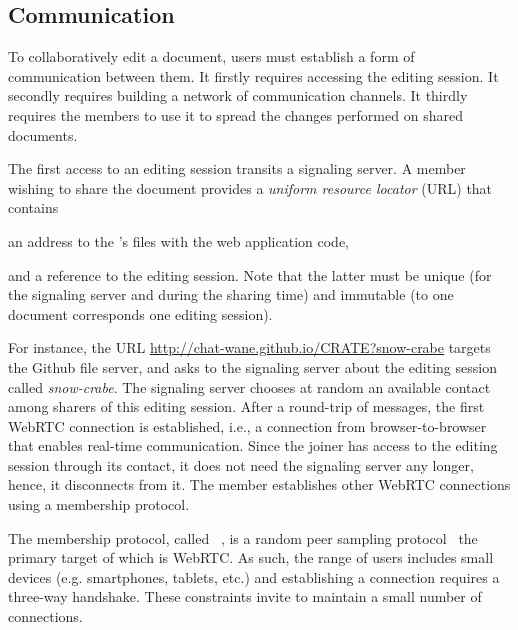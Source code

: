\subsection{Communication}
\label{subsec:communication}

To collaboratively edit a document, users must establish a form of communication
between them. It firstly requires accessing the editing session. It secondly
requires building a network of communication channels. It thirdly requires the
members to use it to spread the changes performed on shared documents.  

\begin{asparadesc}
\item [The first access] to an editing session transits a signaling server. A
  member wishing to share the document provides a \emph{uniform resource
    locator} (URL) that contains
  \begin{inparaenum}[(i)]
  \item an address to the \CRATE's files with the web application
    code,
  \item and a reference to the editing session. Note that the latter must be
    unique (for the signaling server and during the sharing time) and
    immutable (to one document corresponds one editing session).
  \end{inparaenum}
  For instance, the URL \url{http://chat-wane.github.io/CRATE?snow-crabe}
  targets the Github file server, and asks to the signaling server about the
  editing session called \emph{snow-crabe}.  The signaling server chooses at
  random an available contact among sharers of this editing session. After a
  round-trip of messages, the first WebRTC connection is established, i.e., a
  connection from browser-to-browser that enables real-time communication. Since
  the joiner has access to the editing session through its contact, it does not
  need the signaling server any longer, hence, it disconnects from it. The
  member establishes other WebRTC connections using a membership protocol.

\item [The membership protocol,] called \SPRAY~\cite{nedelec2015spray}, is a
  random peer sampling protocol~\cite{jelasity2007gossip} the primary target of
  which is WebRTC.  As such, the range of users includes small devices
  (e.g. smartphones, tablets, etc.) and establishing a connection requires a
  three-way handshake. These constraints invite to maintain a small number of
  connections.


\end{asparadesc}
